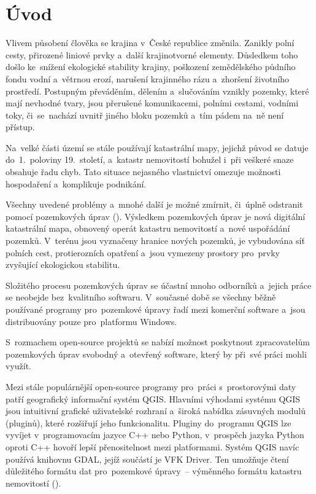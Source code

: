 \chapter{Úvod}
\label{1-uvod}

Vlivem působení člověka se krajina v~České republice změnila. Zanikly polní cesty, přirozené liniové prvky a~další krajinotvorné elementy. Důsledkem toho došlo ke~snížení ekologické stability krajiny, poškození zemědělského půdního fondu vodní a~větrnou erozí, narušení krajinného rázu a~zhoršení životního prostředí. Postupným převáděním, dělením a~slučováním vznikly pozemky, které mají nevhodné tvary, jsou přerušené komunikacemi, polními cestami, vodními toky, či~se~nachází uvnitř jiného bloku pozemků a~tím pádem na~ně není přístup.

Na~velké části území se stále používají katastrální mapy, jejichž původ se datuje do~1.~poloviny 19.~století, a~katastr nemovitostí bohužel i~při veškeré snaze obsahuje řadu chyb. Tato situace nejasného vlastnictví omezuje možnosti hospodaření a~komplikuje podnikání.

Všechny uvedené problémy a~mnohé další je možné zmírnit, či~úplně odstranit pomocí pozemkových úprav (). Výsledkem pozemkových úprav je nová digitální katastrální mapa, obnovený operát katastru nemovitostí a~nové uspořádání pozemků. V~terénu jsou vyznačeny hranice nových pozemků, je vybudována síť polních cest, protierozních opatření a~jsou vymezeny prostory pro~prvky zvyšující ekologickou stabilitu.

Složitého procesu pozemkových úprav se účastní mnoho odborníků a~jejich práce se neobejde bez~kvalitního softwaru. V~současné době se všechny běžně používané programy pro~pozemkové úpravy řadí mezi komerční software a~jsou distribuovány pouze pro~platformu Windows.

S~rozmachem open-source projektů se nabízí možnost poskytnout zpracovatelům pozemkových úprav svobodný a~otevřený software, který by při~své práci mohli využít.

Mezi stále populárnější open-source programy pro~práci s~prostorovými daty patří geografický informační systém QGIS. Hlavními výhodami systému QGIS jsou intuitivní grafické uživatelské rozhraní a~široká nabídka zásuvných modulů (pluginů), které rozšiřují jeho funkcionalitu. Pluginy do~programu QGIS lze vyvíjet v~programovacím jazyce C++ nebo Python, v~prospěch jazyka Python oproti C++ hovoří lepší přenositelnost mezi platformami. Systém QGIS navíc používá knihovnu GDAL, jejíž součástí je VFK Driver. Ten umožňuje čtení důležitého formátu dat pro~pozemkové úpravy~– výměnného formátu katastru nemovitostí ().

